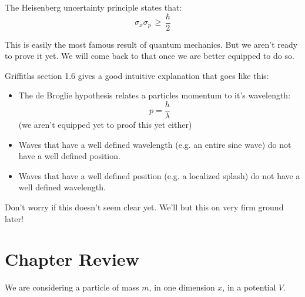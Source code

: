 \documentclass[12pt]{book}
\begin{document}
The Heisenberg uncertainty principle states that:
\begin{equation}
\sigma_x \sigma_p \, \geq \, \frac{\hbar}{2}
\end{equation}

This is easily the most famous result of quantum mechanics.  But we aren't ready to prove it yet. We will come back to that once we are better equipped to do so.

Griffiths section 1.6 gives a good intuitive explanation that goes like this:
\begin{itemize}
\item The de Broglie hypothesis relates a particles momentum to it's wavelength:
\begin{equation}
p = \frac{h}{\lambda}
\end{equation}
(we aren't equipped yet to proof this yet either)
\item Waves that have a well defined wavelength (e.g. an entire sine wave) do not have a well defined position.
\item Waves that have a well defined position (e.g. a localized splash) do not have a well defined wavelength.
\end{itemize}

Don't worry if this doesn't seem clear yet.  We'll but this on very firm ground later!

\section{Chapter Review}

We are considering a particle of mass $m$, in one dimension $x$, in a potential $V$.
\end{document}
